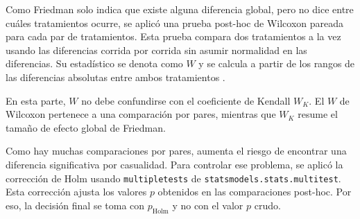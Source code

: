 \documentclass[12pt]{article}
\begin{document}
Como Friedman solo indica que existe alguna diferencia global, pero no dice entre cuáles
tratamientos ocurre, se aplicó una prueba post-hoc de Wilcoxon pareada para cada par de
tratamientos. Esta prueba compara dos tratamientos a la vez usando las diferencias corrida por
corrida sin asumir normalidad en las diferencias. Su estadístico se denota como $W$ y se calcula a partir de los rangos de las diferencias
absolutas entre ambos tratamientos \cite{gibbons2004wilcoxon}.

En esta parte, $W$ no debe confundirse con el coeficiente de Kendall $W_K$. El $W$ de Wilcoxon
pertenece a una comparación por pares, mientras que $W_K$ resume el tamaño de efecto global de
Friedman.

Como hay muchas comparaciones por pares, aumenta el riesgo de encontrar una diferencia
significativa por casualidad. Para controlar ese problema, se aplicó la corrección de Holm usando
\texttt{multipletests} de \texttt{statsmodels.stats.multitest}. Esta corrección ajusta los
valores $p$ obtenidos en las comparaciones post-hoc. Por eso, la decisión final se toma con
$p_{\text{Holm}}$ y no con el valor $p$ crudo.
\end{document}
